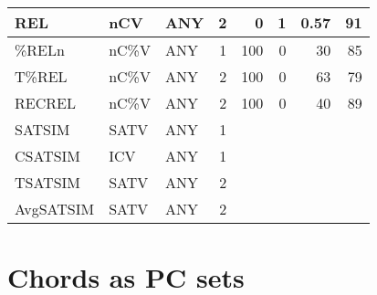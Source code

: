 \documentclass{article}
\begin{document}
\begin{table}[htb]
\begin{center}
\begin{tabular}{lllrrrrr}
 REL         &  nCV     &  ANY   &        2  &     0  &     1  &  0.57  &        91  \\
\hline
 \%RELn      &  nC\%V   &  ANY   &        1  &   100  &     0  &    30  &        85  \\
 T\%REL      &  nC\%V   &  ANY   &        2  &   100  &     0  &    63  &        79  \\
 RECREL      &  nC\%V   &  ANY   &        2  &   100  &     0  &    40  &        89  \\
\hline
 SATSIM      &  SATV    &  ANY   &        1  &        &        &        &            \\
 CSATSIM     &  ICV     &  ANY   &        1  &        &        &        &            \\
 TSATSIM     &  SATV    &  ANY   &        2  &        &        &        &            \\
 AvgSATSIM   &  SATV    &  ANY   &        2  &        &        &        &            \\
\hline
\end{tabular}
\end{center}
\end{table}
\section{Chords as PC sets}
\label{sec-13}
\end{document}
